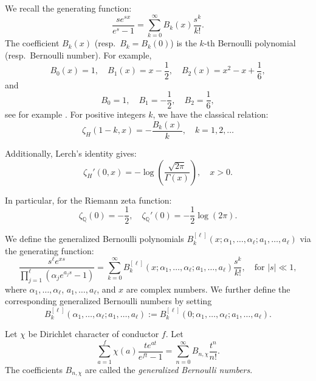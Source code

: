 \documentclass[12pt]{amsart}
\begin{document}
 
 





We recall the generating function:
\[
\frac{s e^{sx}}{e^s - 1} = \sum_{k=0}^\infty B_k(x) \frac{s^k}{k!}.
\]
The coefficient $B_k(x)$ (resp.~$B_k = B_k(0)$) is the $k$-th Bernoulli polynomial (resp.~Bernoulli number). For example,
\[
B_0(x) = 1, \quad B_1(x) = x - \frac{1}{2}, \quad B_2(x) = x^2 - x + \frac{1}{6},
\]
and
\[
B_0 = 1, \quad B_1 = -\frac{1}{2}, \quad B_2 = \frac{1}{6},
\]
see for example \cite[p.~27]{Erdelyi1}.
For positive integers $k$, we have the classical relation:
\[
\zeta_H(1 - k, x) = -\frac{B_k(x)}{k}, \quad k = 1,2,\ldots
\]


Additionally, Lerch's identity gives:
\[
\zeta_H'(0, x) = -\log \left( \frac{\sqrt{2\pi}}{\Gamma(x)} \right), \quad x > 0.
\]


In particular, for the Riemann zeta function:
\[
\zeta_\mathbb{Q}(0) = -\frac{1}{2}, \quad \zeta_\mathbb{Q}'(0) = -\frac{1}{2} \log(2\pi).
\]


We define the generalized Bernoulli polynomials $B_k^{[\ell]}(x; \alpha_1,\ldots,\alpha_\ell; a_1,\ldots,a_\ell)$ via the generating function:
\[
\frac{s^{\ell} e^{xs}}{\prod_{j=1}^\ell (\alpha_j e^{a_j s} - 1)} = \sum_{k=0}^\infty B_k^{[\ell]}(x; \alpha_1,\ldots,\alpha_\ell; a_1,\ldots,a_\ell) \frac{s^k}{k!}, \quad \text{for } |s| \ll 1,
\]
where $\alpha_1,\ldots,\alpha_\ell$, $a_1,\ldots,a_\ell$, and $x$ are complex numbers. We further define the corresponding generalized Bernoulli numbers by setting
\[
B_k^{[\ell]}(\alpha_1,\ldots,\alpha_\ell; a_1,\ldots,a_\ell) := B_k^{[\ell]}(0; \alpha_1,\ldots,\alpha_\ell; a_1,\ldots,a_\ell).
\]


Let $\chi$ be Dirichlet character of conductor $f$. Let
\[
\sum_{a=1}^f \chi(a) \frac{t e^{at}}{e^{ft} - 1} = \sum_{n=0}^\infty B_{n,\chi} \frac{t^n}{n!}.
\]
The coefficients $B_{n,\chi}$ are called the \emph{generalized Bernoulli numbers}.
 
\end{document}
